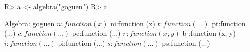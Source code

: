 \begin{Schunk}
% --begin: "goguen.algebra"
\begin{Sinput}
R> a <- algebra("goguen")
R> a
\end{Sinput}
\begin{Soutput}
Algebra: goguen 
 $ n :function (x)  
 $ ni:function (x)  
 $ t :function (...)  
 $ pt:function (...)  
 $ c :function (...)  
 $ pc:function (...)  
 $ r :function (x, y)  
 $ b :function (x, y)  
 $ i :function (...)  
 $ pi:function (...)  
 $ s :function (...)  
 $ ps:function (...)  
\end{Soutput}
% --end: "goguen.algebra"
\end{Schunk}
